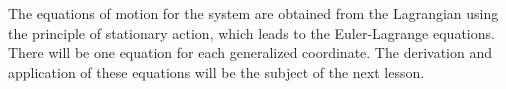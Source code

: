 The equations of motion for the system are obtained from the Lagrangian using the principle of stationary action, which leads to the Euler-Lagrange equations. There will be one equation for each generalized coordinate. The derivation and application of these equations will be the subject of the next lesson.

